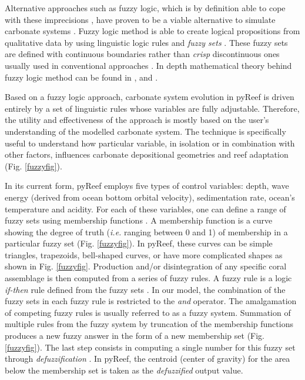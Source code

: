\documentclass[default,jgrga]{agutex2015}
\begin{document}
\begin{article}
Alternative approaches such as fuzzy logic, which is by definition able to cope with these imprecisions \citep{Demicco01, Collin15}, have proven to be a viable alternative to simulate carbonate systems \citep{Salles11, Hattab13}. Fuzzy logic method is able to create logical propositions from qualitative data by using linguistic logic rules and \textit{fuzzy sets} \citep{Nordlund96}. These fuzzy sets are defined with continuous boundaries rather than \textit{crisp} discontinuous ones usually used in conventional approaches \citep{Meesters98}. In depth mathematical theory behind fuzzy logic method can be found in \citet{Zadeh65}, \citet{Zimmerman91} and \citet{Berkan97}.

\noindent Based on a fuzzy logic approach, carbonate system evolution in pyReef is driven entirely by a set of linguistic rules whose variables are fully adjustable. Therefore, the utility and effectiveness of the approach is mostly based on the user's understanding of the modelled carbonate system. The technique is specifically useful to understand how particular variable, in isolation or in combination with other factors, influences carbonate depositional geometries and reef adaptation (Fig. \ref{fuzzyfig}).

In its current form, pyReef employs five types of control variables: depth, wave energy (derived from ocean bottom orbital velocity), sedimentation rate, ocean's temperature and acidity. For each of these variables, one can define a range of fuzzy sets using membership functions \citep{Nordlund99}. A membership function is a curve showing the degree of truth (\textit{i.e.} ranging between 0 and 1) of membership in a particular fuzzy set (Fig. \ref{fuzzyfig}). In pyReef, these curves can be simple triangles, trapezoids, bell-shaped curves, or have more complicated shapes as shown in Fig. \ref{fuzzyfig}. Production and/or disintegration of any specific coral assemblage is then computed from a series of fuzzy rules. A fuzzy rule is a logic \textit{if-then} rule defined from the fuzzy sets \citep{Demicco01}. In our model, the combination of the fuzzy sets in each fuzzy rule is restricted to the \textit{and} operator. The amalgamation of competing fuzzy rules is usually referred to as a fuzzy system. Summation of multiple rules from the fuzzy system by truncation of the membership functions produces a new fuzzy answer in the form of a new membership set (Fig. \ref{fuzzyfig}). The last step consists in computing a single number for this fuzzy set through \textit{defuzzification} \citep{Zadeh65}. In pyReef, the centroid (center of gravity) for the area below the membership set is taken as the \textit{defuzzified} output value.


\end{article}
\end{document}
